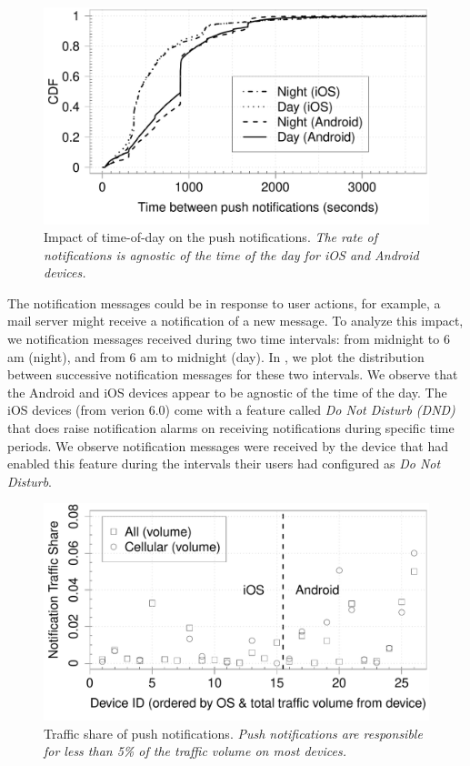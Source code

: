 \begin{figure}
\centering
\includegraphics[width=\columnwidth]{plots/push_compare_diurnal_wild_distrib.pdf}
\caption{Impact of time-of-day on the push notifications. \emph{The rate of notifications is agnostic of the time of the day for iOS and Android devices.}}
\label{fig:push-wild-diurnal}
\end{figure}

The notification messages could be in response to user actions, for example, a mail server might receive a notification of a new message.
To analyze this impact, we notification messages received during two time intervals: from midnight to 6 am (night), and from 6 am to midnight (day). 
In , we plot the distribution between successive notification messages for these two intervals. 
We observe that the Android and iOS devices appear to be agnostic of the time of the day. 
The iOS devices (from verion 6.0) come with a feature called \emph{Do Not Disturb (DND)} that does raise notification alarms on receiving notifications during specific time periods. 
We observe notification messages were received by the device that had enabled this feature during the intervals their users had configured as \emph{Do Not Disturb}.

\begin{figure}
\centering
\includegraphics[width=\columnwidth]{plots/push_compare_trafficshare.pdf}
\caption{Traffic share of push notifications. \emph{Push notifications are responsible for less than 5\% of the traffic volume on most devices.}}
\label{fig:push-traffic-share}
\end{figure}

